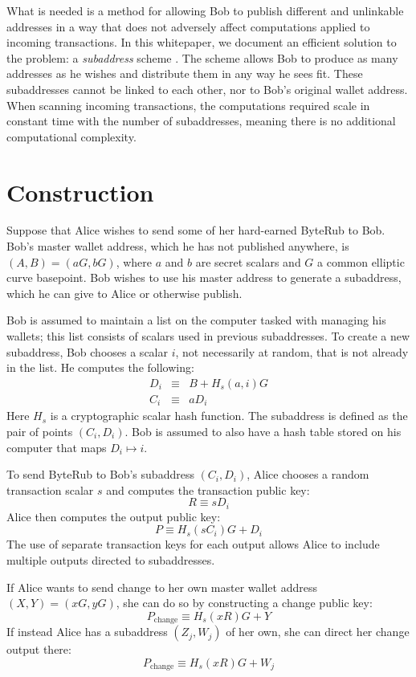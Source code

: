 \documentclass{mrl}
\begin{document}
What is needed is a method for allowing Bob to publish different and unlinkable addresses in a way that does not adversely affect computations applied to incoming transactions. In this whitepaper, we document an efficient solution to the problem: a \textit{subaddress} scheme \cite{pr}. The scheme allows Bob to produce as many addresses as he wishes and distribute them in any way he sees fit. These subaddresses cannot be linked to each other, nor to Bob's original wallet address. When scanning incoming transactions, the computations required scale in constant time with the number of subaddresses, meaning there is no additional computational complexity.


\section{Construction}
Suppose that Alice wishes to send some of her hard-earned ByteRub to Bob. Bob's master wallet address, which he has not published anywhere, is $(A,B) = (aG, bG)$, where $a$ and $b$ are secret scalars and $G$ a common elliptic curve basepoint. Bob wishes to use his master address to generate a subaddress, which he can give to Alice or otherwise publish.

Bob is assumed to maintain a list on the computer tasked with managing his wallets; this list consists of scalars used in previous subaddresses. To create a new subaddress, Bob chooses a scalar $i$, not necessarily at random, that is not already in the list. He computes the following:
\begin{eqnarray*}
D_i &\equiv& B + H_s(a,i)G \\
C_i &\equiv& aD_i
\end{eqnarray*}
Here $H_s$ is a cryptographic scalar hash function. The subaddress is defined as the pair of points $(C_i,D_i)$. Bob is assumed to also have a hash table stored on his computer that maps $D_i \mapsto i$.

To send ByteRub to Bob's subaddress $(C_i,D_i)$, Alice chooses a random transaction scalar $s$ and computes the transaction public key:
$$R \equiv sD_i$$
Alice then computes the output public key:
$$P \equiv H_s(sC_i)G + D_i$$
The use of separate transaction keys for each output allows Alice to include multiple outputs directed to subaddresses.

If Alice wants to send change to her own master wallet address $(X,Y) = (xG,yG)$, she can do so by constructing a change public key:
$$P_{\operatorname{change}} \equiv H_s(xR)G + Y$$
If instead Alice has a subaddress $(Z_j,W_j)$ of her own, she can direct her change output there:
$$P_{\operatorname{change}} \equiv H_s(xR)G + W_j$$
\end{document}
